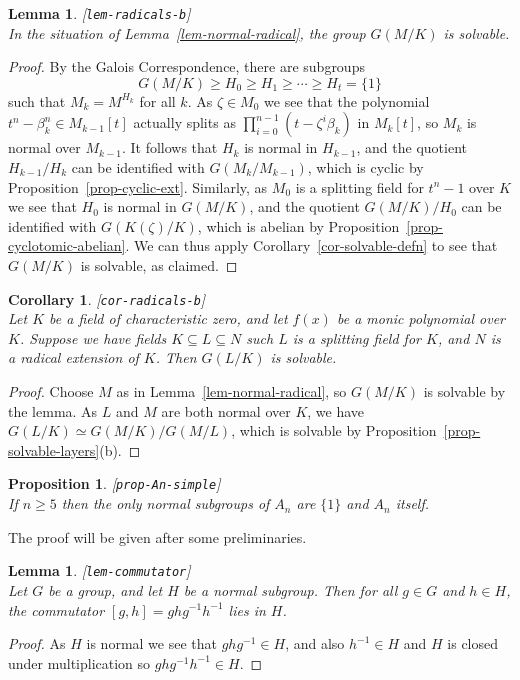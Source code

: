 \documentclass{amsart}
\newcommand{\lbl}[1]{\label{#1}\textup{[\texttt{#1}]}\ \\}
\newcommand{\lbl}{\label}
\newcommand{\bt}        {\beta}
\newcommand{\zt}        {\zeta}
\newcommand{\sse}       {\subseteq}
\renewcommand{\:}{\colon}
\newtheorem{lemma}[theorem]{Lemma}
\newtheorem{proposition}[theorem]{Proposition}
\newtheorem{corollary}[theorem]{Corollary}
\theoremstyle{definition}
\begin{document}
\begin{lemma}\lbl{lem-radicals-b}
 In the situation of Lemma~\ref{lem-normal-radical}, the group
 $G(M/K)$ is solvable.
\end{lemma}
\begin{proof}
 By the Galois Correspondence, there are subgroups 
 \[ G(M/K) \geq H_0 \geq H_1 \geq \dotsb \geq H_t = \{1\} \]
 such that $M_k=M^{H_k}$ for all $k$.  As $\zt\in M_0$ we see that the
 polynomial $t^n-\bt_k^n\in M_{k-1}[t]$ actually splits as
 $\prod_{i=0}^{n-1}(t-\zt^i\bt_k)$ in $M_k[t]$, so $M_k$ is normal
 over $M_{k-1}$.  It follows that $H_k$ is normal in $H_{k-1}$, and
 the quotient $H_{k-1}/H_k$ can be identified with $G(M_k/M_{k-1})$,
 which is cyclic by Proposition~\ref{prop-cyclic-ext}.  Similarly, as
 $M_0$ is a splitting field for $t^n-1$ over $K$ we see that $H_0$ is
 normal in $G(M/K)$, and the quotient $G(M/K)/H_0$ can be identified
 with $G(K(\zt)/K)$, which is abelian by
 Proposition~\ref{prop-cyclotomic-abelian}.  We can thus apply
 Corollary~\ref{cor-solvable-defn} to see that $G(M/K)$ is solvable,
 as claimed.
\end{proof}

\begin{corollary}\lbl{cor-radicals-b}
 Let $K$ be a field of characteristic zero, and let $f(x)$ be a monic
 polynomial over $K$.  Suppose we have fields $K\sse L\sse N$ such
 $L$ is a splitting field for $K$, and $N$ is a radical extension of
 $K$.  Then $G(L/K)$ is solvable.
\end{corollary}
\begin{proof}
 Choose $M$ as in Lemma~\ref{lem-normal-radical}, so $G(M/K)$ is
 solvable by the lemma.  As $L$ and $M$ are both normal over
 $K$, we have $G(L/K)\simeq G(M/K)/G(M/L)$, which is solvable by
 Proposition~\ref{prop-solvable-layers}(b). 
\end{proof}

\begin{proposition}\lbl{prop-An-simple}
 If $n\geq 5$ then the only normal subgroups of $A_n$ are $\{1\}$ and
 $A_n$ itself.  
\end{proposition}

The proof will be given after some preliminaries.

\begin{lemma}\lbl{lem-commutator}
 Let $G$ be a group, and let $H$ be a normal subgroup.  Then for all
 $g\in G$ and $h\in H$, the commutator $[g,h]=ghg^{-1}h^{-1}$ lies in
 $H$.  
\end{lemma}
\begin{proof}
 As $H$ is normal we see that $ghg^{-1}\in H$, and also $h^{-1}\in H$
 and $H$ is closed under multiplication so $ghg^{-1}h^{-1}\in H$.
\end{proof}
\end{document}

